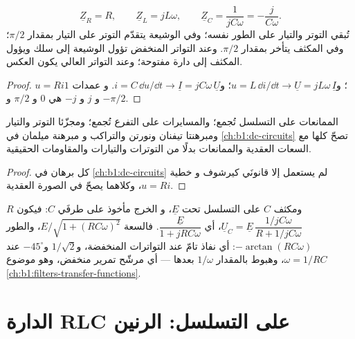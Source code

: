 \begin{proposition}[ممانعات R و L و C]\label{prop:b1:sinusoidal-impedance:rlc}
\[
\underline Z_R = R, \qquad \underline Z_L = jL\omega, \qquad
\underline Z_C = \frac{1}{jC\omega} = -\frac{j}{C\omega} .
\]
 تُبقي التوتر والتيار على الطور نفسه؛ وفي الوشيعة يتقدّم التوتر
على التيار بمقدار $\pi/2$؛ وفي المكثف يتأخر بمقدار $\pi/2$. وعند التواتر
المنخفض تؤول الوشيعة إلى سلك ويؤول المكثف إلى دارة مفتوحة؛ وعند
التواتر العالي يكون العكس.
\end{proposition}

\begin{proof}
$u = Ri$؛ و$u = L\,\dd i/\dd t \to \underline U = jL\omega\,\underline I$؛
و$i = C\,\dd u/\dd t \to \underline I = jC\omega\,\underline U$. و
عمدات $1$ و $j$ و $-j$ هي $0$ و $\pi/2$ و $-\pi/2$.
\end{proof}

\begin{proposition}\label{prop:b1:sinusoidal-impedance:assoc}
الممانعات على التسلسل تُجمع؛ والمسايرات على التفرع تُجمع؛ ومجزّئا التوتر
والتيار ومبرهنتا تيفنان ونورتن والتراكب و
مبرهنة ميلمان في \cref{ch:b1:dc-circuits} تصحّ كلها مع السعات
العقدية والممانعات بدلًا من التوترات والتيارات والمقاومات
الحقيقية.
\end{proposition}

\begin{proof}
كل برهان في \cref{ch:b1:dc-circuits} لم يستعمل إلا قانونَي كيرشوف و
خطية $u = Ri$، وكلاهما يصحّ في الصورة العقدية.
\end{proof}

\begin{example}[مجزّئ RC]\label{ex:b1:sinusoidal-impedance:rcdivider}
 $R$ ومكثف $C$ على التسلسل تحت $\underline E$، و
الخرج مأخوذ على طرفَي $C$: فيكون $\underline U_C = \underline E\,\dfrac{1/jC\omega}
{R + 1/jC\omega}$، أي $\dfrac{\underline E}{1 + jRC\omega}$. فالسعة
$E/\sqrt{1 + (RC\omega)^2}$، والطور $-\arctan(RC\omega)$: أي نفاذ
تامّ عند التواترات المنخفضة، و$1/\sqrt2$ و$-45^\circ$ عند
$\omega = 1/RC$، وهبوط بالمقدار $1/\omega$ بعدها --- أي مرشّح تمرير منخفض، وهو
موضوع \cref{ch:b1:filters-transfer-functions}.
\end{example}

\section{الدارة RLC على التسلسل: الرنين}

